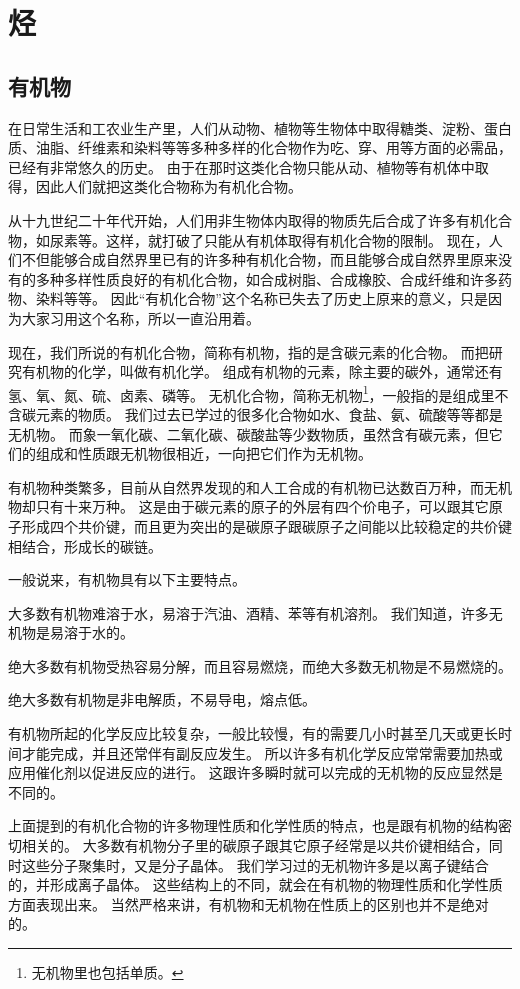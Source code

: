 \chapter{烃}
\section{有机物}
在日常生活和工农业生产里，人们从动物、植物等生物体中取得糖类、淀粉、蛋白质、油脂、纤维素和染料等等多种多样的化合物作为吃、穿、用等方面的必需品，已经有非常悠久的历史。
由于在那时这类化合物只能从动、植物等有机体中取得，因此人们就把这类化合物称为有机化合物。

从十九世纪二十年代开始，人们用非生物体内取得的物质先后合成了许多有机化合物，如尿素等。这样，就打破了只能从有机体取得有机化合物的限制。
现在，人们不但能够合成自然界里已有的许多种有机化合物，而且能够合成自然界里原来没有的多种多样性质良好的有机化合物，如合成树脂、合成橡胶、合成纤维和许多药物、染料等等。
因此“有机化合物”这个名称已失去了历史上原来的意义，只是因为大家习用这个名称，所以一直沿用着。

现在，我们所说的有机化合物，简称有机物，指的是含碳元素的化合物。
而把研究有机物的化学，叫做有机化学。
组成有机物的元素，除主要的碳外，通常还有氢、氧、氮、硫、卤素、磷等。
无机化合物，简称无机物\footnote{无机物里也包括单质。}，一般指的是组成里不含碳元素的物质。
我们过去已学过的很多化合物如水、食盐、氨、硫酸等等都是无机物。
而象一氧化碳、二氧化碳、碳酸盐等少数物质，虽然含有碳元素，但它们的组成和性质跟无机物很相近，一向把它们作为无机物。

有机物种类繁多，目前从自然界发现的和人工合成的有机物已达数百万种，而无机物却只有十来万种。
这是由于碳元素的原子的外层有四个价电子，可以跟其它原子形成四个共价键，而且更为突出的是碳原子跟碳原子之间能以比较稳定的共价键相结合，形成长的碳链。

一般说来，有机物具有以下主要特点。

大多数有机物难溶于水，易溶于汽油、酒精、苯等有机溶剂。
我们知道，许多无机物是易溶于水的。

绝大多数有机物受热容易分解，而且容易燃烧，而绝大多数无机物是不易燃烧的。

绝大多数有机物是非电解质，不易导电，熔点低。

有机物所起的化学反应比较复杂，一般比较慢，有的需要几小时甚至几天或更长时间才能完成，并且还常伴有副反应发生。
所以许多有机化学反应常常需要加热或应用催化剂以促进反应的进行。
这跟许多瞬时就可以完成的无机物的反应显然是不同的。

上面提到的有机化合物的许多物理性质和化学性质的特点，也是跟有机物的结构密切相关的。
大多数有机物分子里的碳原子跟其它原子经常是以共价键相结合，同时这些分子聚集时，又是分子晶体。
我们学习过的无机物许多是以离子键结合的，并形成离子晶体。
这些结构上的不同，就会在有机物的物理性质和化学性质方面表现出来。
当然严格来讲，有机物和无机物在性质上的区别也并不是绝对的。

